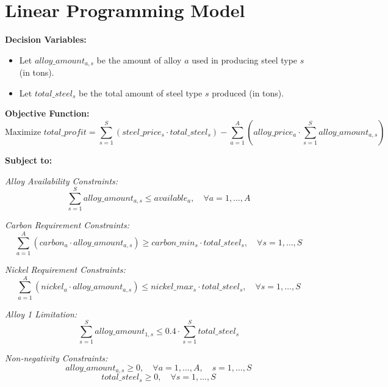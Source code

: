 \documentclass{article}
\begin{document}
\section*{Linear Programming Model}

\textbf{Decision Variables:}
\begin{itemize}
    \item Let \( alloy\_amount_{a,s} \) be the amount of alloy \( a \) used in producing steel type \( s \) (in tons).
    \item Let \( total\_steel_{s} \) be the total amount of steel type \( s \) produced (in tons).
\end{itemize}

\textbf{Objective Function:}
\[
\text{Maximize } total\_profit = \sum_{s=1}^{S} (steel\_price_{s} \cdot total\_steel_{s}) - \sum_{a=1}^{A} (alloy\_price_{a} \cdot \sum_{s=1}^{S} alloy\_amount_{a,s})
\]

\textbf{Subject to:}

\textit{Alloy Availability Constraints:}
\[
\sum_{s=1}^{S} alloy\_amount_{a,s} \leq available_{a}, \quad \forall a = 1, \ldots, A
\]

\textit{Carbon Requirement Constraints:}
\[
\sum_{a=1}^{A} (carbon_{a} \cdot alloy\_amount_{a,s}) \geq carbon\_min_{s} \cdot total\_steel_{s}, \quad \forall s = 1, \ldots, S
\]

\textit{Nickel Requirement Constraints:}
\[
\sum_{a=1}^{A} (nickel_{a} \cdot alloy\_amount_{a,s}) \leq nickel\_max_{s} \cdot total\_steel_{s}, \quad \forall s = 1, \ldots, S
\]

\textit{Alloy 1 Limitation:}
\[
\sum_{s=1}^{S} alloy\_amount_{1,s} \leq 0.4 \cdot \sum_{s=1}^{S} total\_steel_{s}
\]

\textit{Non-negativity Constraints:}
\[
alloy\_amount_{a,s} \geq 0, \quad \forall a = 1, \ldots, A, \quad s = 1, \ldots, S
\]
\[
total\_steel_{s} \geq 0, \quad \forall s = 1, \ldots, S
\]
\end{document}
